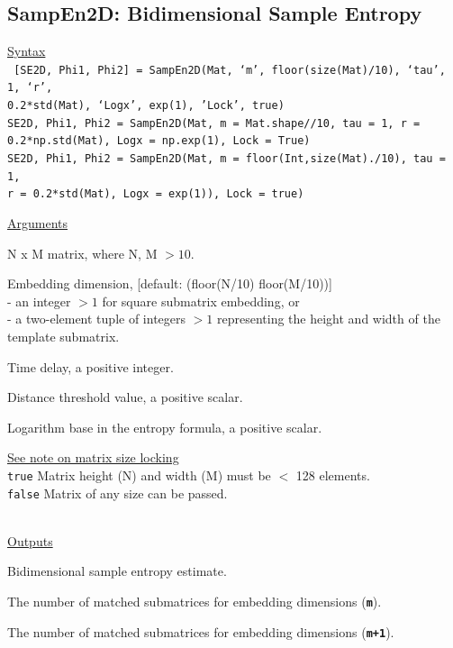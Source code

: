 \documentclass[12pt, a4paper, titlepage, openany]{book}
\begin{document}
\subsection{\normalsize SampEn2D: \hspace{15mm} Bidimensional Sample Entropy}
\noindent\ul{Syntax} \vspace{6mm} \\ \noindent \texttt{\footnotesize
[SE2D, Phi1, Phi2] = SampEn2D(Mat, ‘m’, floor(size(Mat)/10), ‘tau’, 1, ‘r’, \\0.2*std(Mat), ‘Logx’, exp(1), 'Lock', true)\\
SE2D, Phi1, Phi2  = SampEn2D(Mat, m = Mat.shape//10, tau = 1, r = 0.2*np.std(Mat), Logx = np.exp(1), Lock = True)\\
SE2D, Phi1, Phi2 = SampEn2D(Mat, m = floor(Int,size(Mat)./10), tau = 1, \\ r = 0.2*std(Mat), Logx = exp(1)), Lock = true)}

\noindent \ul{Arguments}
\begin{description}[labelsep=1cm, labelwidth=2cm, nosep,,style=multiline,leftmargin=3cm]\footnotesize
\item[\texttt{Mat}]		N x M matrix,  where N, M $> 10$.
\item[\texttt{m}]		Embedding dimension, [default: (floor(N/10) floor(M/10))]\\
						- an integer $> 1$ for square submatrix embedding, or\\
						- a two-element tuple of integers $> 1$ representing the height and width of the template submatrix.
\item[\texttt{tau}]		Time delay, a positive integer.
\item[\texttt{r}]		Distance threshold value, a positive scalar.
\item[\texttt{Logx}]	Logarithm base in the entropy formula, a positive scalar.
\item[\texttt{Lock}]	\hyperlink{bidinote}{\ul{See note on matrix size locking}}\\
					\texttt{true} \hspace{15pt} Matrix height (N) and width (M) must be $<$ 128 elements.\\
					\texttt{false}\hspace{12pt} Matrix of any size can be passed.\\ \
\end{description}

\noindent \ul{Outputs}
\begin{description}[labelsep=1cm, labelwidth=2cm, nosep, style=multiline,leftmargin=3cm]\footnotesize
\item[\texttt{SE2D}]		Bidimensional sample entropy estimate.
\item[\texttt{Phi1}]		The number of matched submatrices for embedding dimensions (\texttt{\textbf{m}}).
\item[\texttt{Phi2}]		The number of matched submatrices for embedding dimensions (\texttt{\textbf{m+1}}).
\end{description}
\end{document}
